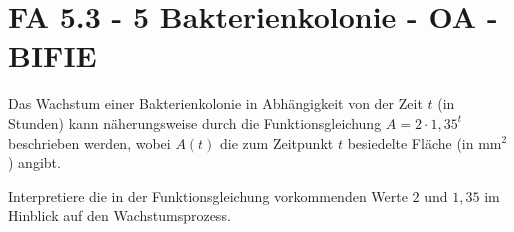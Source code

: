 \section{FA 5.3 - 5 Bakterienkolonie - OA - BIFIE}

\begin{beispiel}[FA 5.3]{1} %
Das Wachstum einer Bakterienkolonie in Abhängigkeit von der Zeit $t$ (in Stunden) kann näherungsweise
durch die Funktionsgleichung $A = 2 \cdot 1,35^t$
 beschrieben werden, wobei $A(t)$ die
zum Zeitpunkt $t$ besiedelte Fläche (in $\text{mm}^2$) angibt. 

\leer

Interpretiere die in der Funktionsgleichung vorkommenden Werte $2$ und $1,35$ im Hinblick auf den Wachstumsprozess.


\end{beispiel}